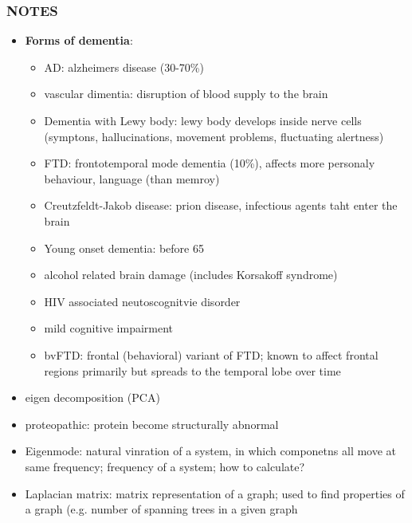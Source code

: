\documentclass[fleqn]{article}\usepackage{caption}
\begin{document}
\subsubsection{NOTES}
\begin{itemize}
\item \textbf{Forms of dementia}:
\begin{itemize}
\item AD: alzheimers disease (30-70\%)
\item vascular dimentia: disruption of blood supply to the brain
\item Dementia with Lewy body: lewy body develops inside nerve cells (symptons, hallucinations, movement problems, fluctuating alertness)
\item FTD: frontotemporal mode dementia (10\%), affects more personaly behaviour, language (than memroy)
\item Creutzfeldt-Jakob disease: prion disease, infectious agents taht enter the brain
\item Young onset dementia: before 65
\item alcohol related brain damage (includes Korsakoff syndrome)
\item HIV associated neutoscognitvie disorder
\item mild cognitive impairment
\item bvFTD: frontal (behavioral) variant of FTD; known to affect frontal regions primarily but spreads to the temporal lobe over time
\end{itemize}
\item eigen decomposition (PCA)
\item proteopathic: protein become structurally abnormal
\item Eigenmode: natural vinration of a system, in which componetns all move at same frequency; frequency of a system; how to calculate?
\item Laplacian matrix: matrix representation of  a graph; used to find properties of a graph (e.g. number of spanning trees in a given graph
\end{itemize}
\end{document}
